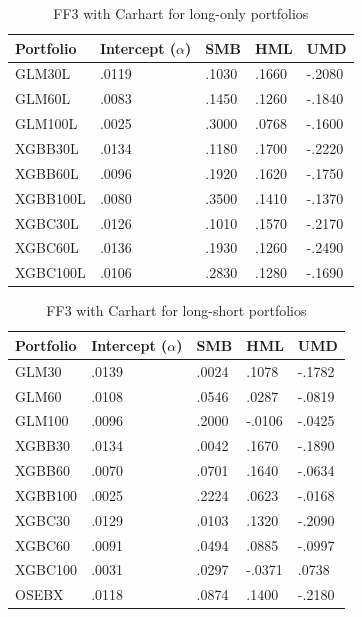 \begin{table}[H]
\centering
\begin{tabular}{lllll}
\hline
Portfolio & Intercept ($\alpha$) & SMB & HML & UMD \\
\hline
GLM30L   & .0119 & .1030 & .1660 & -.2080 \\ 
GLM60L   & .0083 & .1450 & .1260 & -.1840 \\ 
GLM100L  & .0025 & .3000 & .0768 & -.1600 \\ 
XGBB30L  & .0134 & .1180 & .1700 & -.2220 \\ 
XGBB60L  & .0096 & .1920 & .1620 & -.1750 \\ 
XGBB100L & .0080 & .3500 & .1410 & -.1370 \\ 
XGBC30L  & .0126 & .1010 & .1570 & -.2170 \\ 
XGBC60L  & \cellcolor{lightlightgreen} .0136 & .1930 & .1260 & -.2490 \\ 
XGBC100L & .0106 & .2830 & .1280 & -.1690 \\ 
\hline
\end{tabular}
\vspace{1em}
\caption{FF3 with Carhart for long-only portfolios}
\label{tab:new-famafrench-trading-long-only}
\end{table}

\begin{table}[H]
\centering
\begin{tabular}{lllll}
\hline
Portfolio & Intercept ($\alpha$) & SMB & HML & UMD \\ 
\hline
GLM30  & \cellcolor{lightlightgreen} .0139 & .0024 & .1078 & -.1782 \\ 
GLM60  & .0108 & .0546 & .0287 & -.0819 \\ 
GLM100 & .0096 & .2000 & -.0106 & -.0425 \\ 
XGBB30 & .0134 & .0042 & .1670 & -.1890 \\ 
XGBB60 & .0070 & .0701 & .1640 & -.0634 \\ 
XGBB100& .0025 & .2224 & .0623 & -.0168 \\ 
XGBC30 & .0129 & .0103 & .1320 & -.2090 \\ 
XGBC60 & .0091 & .0494 & .0885 & -.0997 \\ 
XGBC100& .0031 & .0297 & -.0371 & .0738 \\ 
OSEBX  & .0118 & .0874 & .1400 & -.2180 \\ 
\hline
\end{tabular}
\vspace{1em}
\caption{FF3 with Carhart for long-short portfolios}
\label{tab:new-famafrench-trading-long-short}
\end{table}



